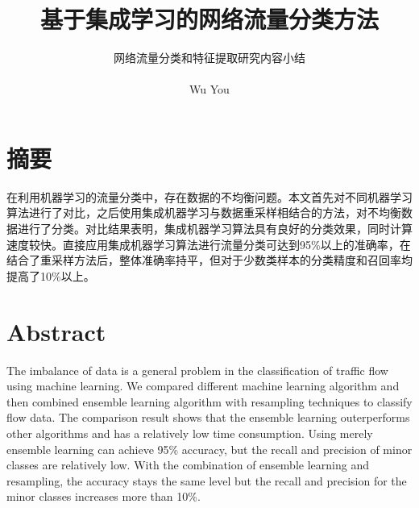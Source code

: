 \documentclass[a4papper]{article}
\title{}
\title{基于集成学习的网络流量分类方法}
\author{网络流量分类和特征提取研究内容小结\\\\
Wu You\\
}
\begin{document}
\maketitle
\tableofcontents
\thispagestyle{empty}%
\newpage
\setcounter{page}{1}%
\setcounter{section}{0}%
\section*{摘要}
\par\setlength{\parindent}{2em} %
在利用机器学习的流量分类中，存在数据的不均衡问题。本文首先对不同机器学习算法进行了对比，之后使用集成机器学习与数据重采样相结合的方法，对不均衡数据进行了分类。对比结果表明，集成机器学习算法具有良好的分类效果，同时计算速度较快。直接应用集成机器学习算法进行流量分类可达到95\%以上的准确率，在结合了重采样方法后，整体准确率持平，但对于少数类样本的分类精度和召回率均提高了10\%以上。
\section*{Abstract}
\par\setlength{\parindent}{2em} %
The imbalance of data is a general problem in the classification of traffic flow using machine learning. We compared different machine learning algorithm and then combined ensemble learning algorithm with resampling techniques to classify flow data. The comparison result shows that the ensemble learning outerperforms other algorithms and has a relatively low time consumption. Using merely ensemble learning can achieve 95\% accuracy, but the recall and precision of minor classes are relatively low. With the combination of ensemble learning and resampling, the accuracy stays the same level but the recall and precision for the minor classes increases more than 10\%.
\end{document}
